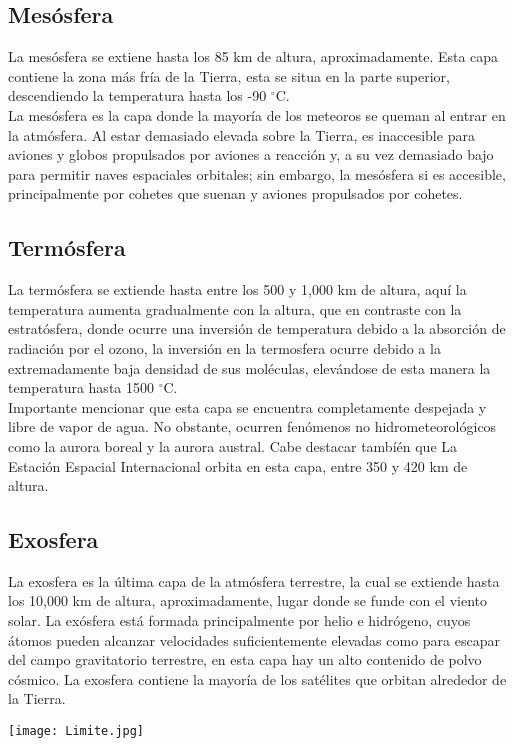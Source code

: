 \documentclass{article}
\begin{document}
\begin{doublespace}
\subsection{Mesósfera}

La mesósfera se extiene hasta los 85 km de altura, aproximadamente. Esta capa contiene la zona más fría de la Tierra, esta se situa en la parte superior, descendiendo la temperatura hasta los -90 $^{\circ}$C. 
\\
La mesósfera es la capa donde la mayoría de los meteoros se queman al entrar en la atmósfera. Al estar demasiado elevada sobre la Tierra, es inaccesible para aviones y globos propulsados por aviones a reacción y, a su vez demasiado bajo para permitir naves espaciales orbitales; sin embargo, la mesósfera si es accesible, principalmente por cohetes que suenan y aviones propulsados por cohetes.

\subsection{Termósfera}
La termósfera se extiende hasta entre los 500 y 1,000 km de altura, aquí la temperatura aumenta gradualmente con la altura, que en contraste con la estratósfera, donde ocurre una inversión de temperatura debido a la absorción de radiación por el ozono, la inversión en la termosfera ocurre debido a la extremadamente baja densidad de sus moléculas, elevándose de esta manera la temperatura hasta 1500 $^{\circ}$C.
\\
Importante mencionar que esta capa se encuentra completamente despejada y libre de vapor de agua. No obstante, ocurren fenómenos no hidrometeorológicos como la aurora boreal y la aurora austral. Cabe destacar tambíén que 
La Estación Espacial Internacional orbita en esta capa, entre 350 y 420 km de altura.

\subsection{Exosfera}
La exosfera es la última capa de la atmósfera terrestre, la cual se extiende hasta los 10,000 km de altura, aproximadamente, lugar donde se funde con el viento solar. La exósfera está formada principalmente por helio e hidrógeno, cuyos átomos pueden alcanzar velocidades suficientemente elevadas como para escapar del campo gravitatorio terrestre, en esta capa hay un alto contenido de polvo cósmico. La exosfera contiene la mayoría de los satélites que orbitan alrededor de la Tierra.
\begin{center}
\texttt{[image: Limite.jpg]}
\end{center}


\end{doublespace}
\end{document}
